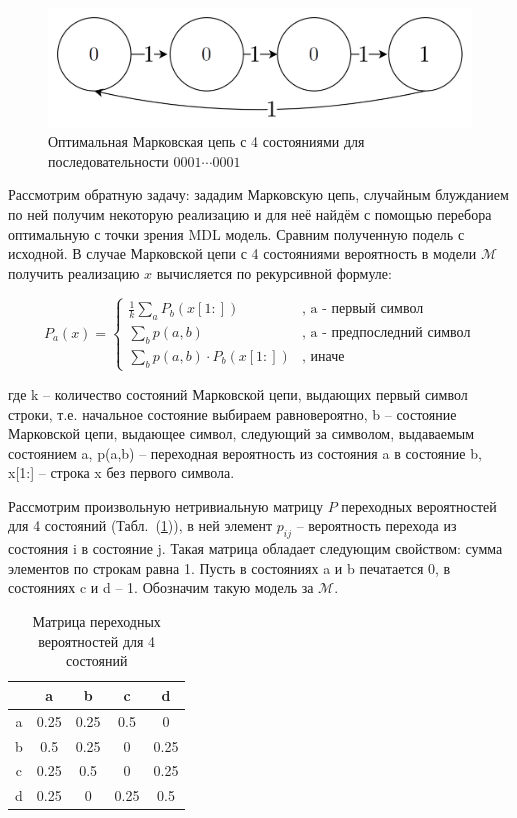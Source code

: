 \documentclass[12pt]{article}
\begin{document}
	\begin{figure}[!h]
		\caption{Оптимальная Марковская цепь с 4 состояниями для последовательности $0001\cdots0001$}
		\label{pic:M4}
		\centering
		\includegraphics[width=0.6\linewidth]{images/M4_0001.png}
	\end{figure}
	
	Рассмотрим обратную задачу: зададим Марковскую цепь, случайным блужданием по ней получим некоторую реализацию и для неё найдём с помощью перебора оптимальную с точки зрения MDL модель. Сравним полученную подель с исходной. В случае Марковской цепи с 4 состояниями вероятность в модели $\mathcal{M}$ получить реализацию $x$ вычисляется по рекурсивной формуле:
	
	\begin{equation}
		P_a(x) =
		\begin{cases}
			\frac{1}{k}\sum_a P_b(x[1:]) & \text{, a - первый символ}\\
			\sum_b p(a,b)& \text{, a - предпоследний символ}\\
			\sum_b p(a,b)\cdot P_b(x[1:])& \text{, иначе}
		\end{cases}
	\end{equation}

	где k -- количество состояний Марковской цепи, выдающих первый символ строки, т.е. начальное состояние выбираем равновероятно, b -- состояние Марковской цепи, выдающее символ, следующий за символом, выдаваемым состоянием a, p(a,b) -- переходная вероятность из состояния a в состояние b, x[1:] -- строка x без первого символа.
	
	Рассмотрим произвольную нетривиальную матрицу $P$ переходных вероятностей для 4 состояний (Табл.~(\ref{table:matrix4})), в ней элемент $p_{ij}$ -- вероятность перехода из состояния i в состояние j. Такая матрица обладает следующим свойством: сумма элементов по строкам равна 1. Пусть в состояниях a и b печатается 0, в состояниях c и d -- 1. Обозначим такую модель за $\mathcal{M}$.
	
	
	
	\begin{table}[!h]
		\caption{Матрица переходных вероятностей для 4 состояний}
		\label{table:matrix4}
		\begin{center}
			\begin{tabular}{|c|c|c|c|c|}
				\hline
				 & a & b & c & d \\
				\hline
				a & 0.25 & 0.25 & 0.5 & 0\\
				\hline
				b & 0.5 & 0.25 & 0 & 0.25 \\
				\hline
				c & 0.25 & 0.5 & 0 & 0.25 \\
				\hline
				d & 0.25 & 0 & 0.25 & 0.5 \\
				\hline
			\end{tabular}
		\end{center}
	\end{table}
\end{document}
